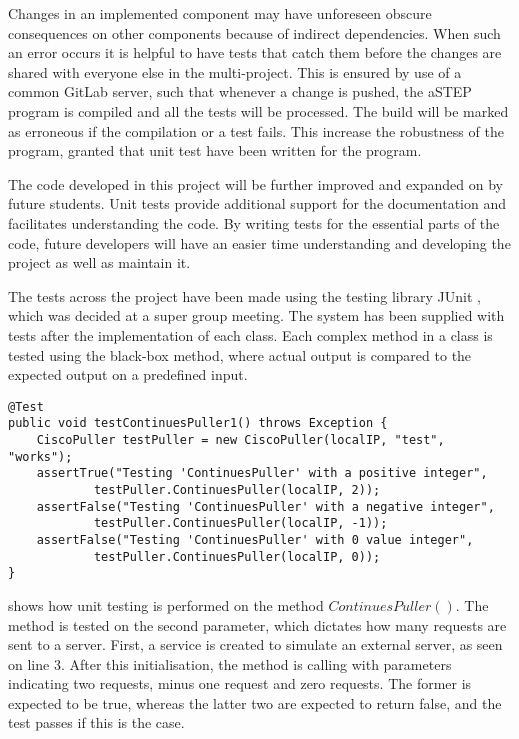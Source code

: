 Changes in an implemented component may have unforeseen obscure consequences on other components because of indirect dependencies. When such an error occurs it is helpful to have tests that catch them before the changes are shared with everyone else in the multi-project. This is ensured by use of a common GitLab server, such that whenever a change is pushed, the aSTEP program is compiled and all the tests will be processed. The build will be marked as erroneous if the compilation or a test fails. This increase the robustness of the program, granted that unit test have been written for the program.

The code developed in this project will be further improved and expanded on by future students. Unit tests provide additional support for the documentation and facilitates understanding the code.
By writing tests for the essential parts of the code, future developers will have an easier time understanding and developing the project as well as maintain it. 

The tests across the project have been made using the testing library JUnit \cite{junit4}, which was decided at a super group meeting. The system has been supplied with tests after the implementation of each class. Each complex method in a class is tested using the black-box method, where actual output is compared to the expected output on a predefined input.

\begin{lstlisting}[caption={Testing ContinuesPuller},label={lst:test_continuespuller},language=inc_Java, mathescape]
@Test
public void testContinuesPuller1() throws Exception {
    CiscoPuller testPuller = new CiscoPuller(localIP, "test", "works");
    assertTrue("Testing 'ContinuesPuller' with a positive integer",
            testPuller.ContinuesPuller(localIP, 2));
    assertFalse("Testing 'ContinuesPuller' with a negative integer",
            testPuller.ContinuesPuller(localIP, -1));
    assertFalse("Testing 'ContinuesPuller' with 0 value integer",
            testPuller.ContinuesPuller(localIP, 0));
}
\end{lstlisting}
 shows how unit testing is performed on the method $ContinuesPuller()$. The method is tested on the second parameter, which dictates how many requests are sent to a server. First, a service is created to simulate an external server, as seen on line 3. After this initialisation, the method is calling with parameters indicating two requests, minus one request and zero requests. The former is expected to be true, whereas the latter two are expected to return false, and the test passes if this is the case. 